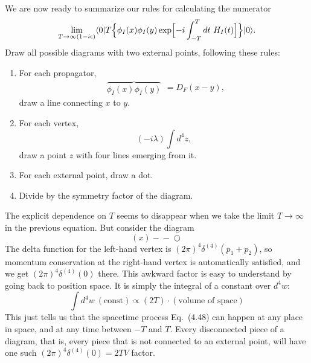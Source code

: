 We are now ready to summarize our rules for calculating the numerator
\begin{equation}
  \lim_{T\to\infty(1-i\epsilon)}
    \langle 0|T\Bigl\{ \phi_I(x)\phi_I(y)\exp\Bigl[ -i\int_{-T}^{T}dt\ H_I(t)
      \Bigr] \Bigr\}|0\rangle .
\end{equation}
Draw all possible diagrams with two external points, following these rules:
\begin{enumerate}
  \item For each propagator,
    \begin{equation}
      \begin{array}{c}
        \overbrace{\phi_I(x)\phi_I(y)}
      \end{array} = D_F(x-y),
    \end{equation}
    draw a line connecting $x$ to $y$.
  \item For each vertex,
    \begin{equation}
      (-i\lambda)\int d^4z,
    \end{equation}
    draw a point $z$ with four lines emerging from it.
  \item For each external point, draw a dot.
  \item Divide by the symmetry factor of the diagram.
\end{enumerate}

The explicit dependence on $T$ seems to disappear when we take the limit
$T\to\infty$ in the previous equation.  But consider the diagram
\begin{equation}
  (x)\!-\!-\!\bigcirc
\end{equation}
The delta function for the left-hand vertex is $(2\pi)^4\delta^{(4)}(p_1+p_2)$,
so momentum conservation at the right-hand vertex is automatically satisfied,
and we get $(2\pi)^4\delta^{(4)}(0)$ there.  This awkward factor is easy to
understand by going back to position space.  It is simply the integral of a
constant over $d^4w$:
\begin{equation}
  \int d^4w\ (\text{const}) \propto (2T)\cdot(\text{volume of space})
  \label{eq:4.49}
\end{equation}
This just tells us that the spacetime process Eq.~(4.48) can happen at
any place in space, and at any time between $-T$ and $T$.  Every disconnected
piece of a diagram, that is, every piece that is not connected to an external
point, will have one such $(2\pi)^4\delta^{(4)}(0) = 2TV$ factor.

